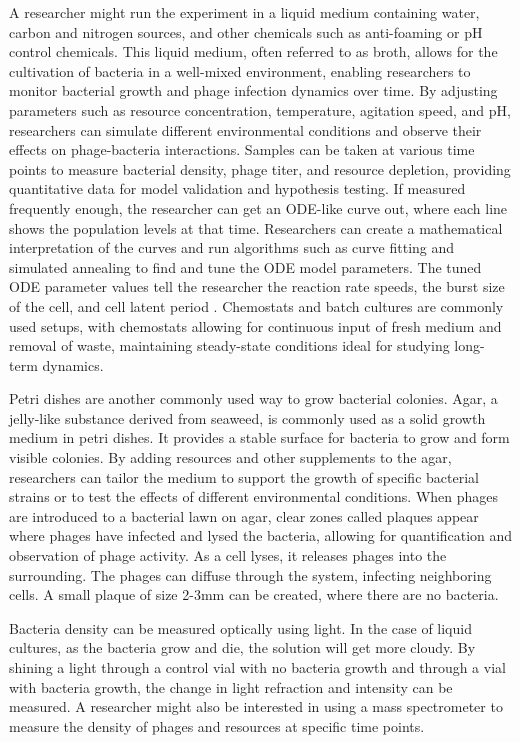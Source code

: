 A researcher might run the experiment in a liquid medium containing water, carbon and nitrogen sources, and other chemicals such as anti-foaming or pH control chemicals. 
This liquid medium, often referred to as broth, allows for the cultivation of bacteria in a well-mixed environment, enabling researchers to monitor bacterial growth and phage infection dynamics over time. 
By adjusting parameters such as resource concentration, temperature, agitation speed, and pH, researchers can simulate different environmental conditions and observe their effects on phage-bacteria interactions. 
Samples can be taken at various time points to measure bacterial density, phage titer, and resource depletion, providing quantitative data for model validation and hypothesis testing. 
If measured frequently enough, the researcher can get an ODE-like curve out, where each line shows the population levels at that time. 
Researchers can create a mathematical interpretation of the curves and run algorithms such as curve fitting and simulated annealing to find and tune the ODE model parameters. 
The tuned ODE parameter values tell the researcher the reaction rate speeds, the burst size of the cell, and cell latent period \cite{gengUsingBacterialPopulation2024, mullaExtremeDiversityPhage2024}. 
Chemostats and batch cultures are commonly used setups, with chemostats allowing for continuous input of fresh medium and removal of waste, maintaining steady-state conditions ideal for studying long-term dynamics.

Petri dishes are another commonly used way to grow bacterial colonies. 
Agar, a jelly-like substance derived from seaweed, is commonly used as a solid growth medium in petri dishes. 
It provides a stable surface for bacteria to grow and form visible colonies. 
By adding resources and other supplements to the agar, researchers can tailor the medium to support the growth of specific bacterial strains or to test the effects of different environmental conditions. 
When phages are introduced to a bacterial lawn on agar, clear zones called plaques appear where phages have infected and lysed the bacteria, allowing for quantification and observation of phage activity. 
As a cell lyses, it releases phages into the surrounding. 
The phages can diffuse through the system, infecting neighboring cells. 
A small plaque of size 2-3mm can be created, where there are no bacteria. 

Bacteria density can be measured optically using light. 
In the case of liquid cultures, as the bacteria grow and die, the solution will get more cloudy. 
By shining a light through a control vial with no bacteria growth and through a vial with bacteria growth, the change in light refraction and intensity can be measured. 
A researcher might also be interested in using a mass spectrometer to measure the density of phages and resources at specific time points. 


